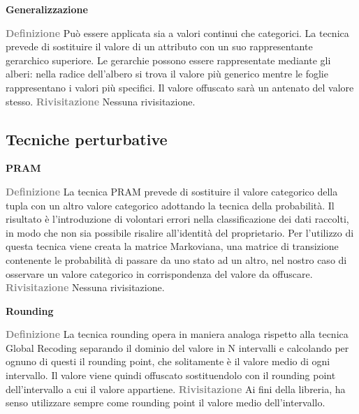 \medskip
\noindent\textbf{Generalizzazione}
\begin{adjustwidth}{2.5em}{0pt}
 \textbf{\textcolor{gray}{Definizione}} \newline
Può essere applicata sia a valori continui che categorici. La tecnica prevede di sostituire il valore di un attributo con un suo rappresentante gerarchico superiore.  Le gerarchie possono essere rappresentate mediante gli alberi: nella radice dell’albero si trova il valore più generico mentre le foglie rappresentano i valori più specifici. Il valore offuscato sarà un antenato del valore stesso.\newline
\textbf{\textcolor{gray}{Rivisitazione}} \newline
Nessuna rivisitazione.
\end{adjustwidth}

\subsection*{Tecniche perturbative}

\noindent\textbf{PRAM}
\begin{adjustwidth}{2.5em}{0pt}
 \textbf{\textcolor{gray}{Definizione}} \newline
La tecnica PRAM prevede di sostituire il valore categorico della tupla con un altro valore categorico adottando la tecnica della probabilità. Il risultato è l'introduzione di volontari errori nella classificazione dei dati raccolti, in modo che non sia possibile risalire all’identità del proprietario. Per l’utilizzo di questa tecnica viene creata la matrice Markoviana, una matrice di transizione contenente le probabilità di passare da uno stato ad un altro, nel nostro caso di osservare un valore categorico in corrispondenza del valore da offuscare. \newline
\textbf{\textcolor{gray}{Rivisitazione}} \newline
Nessuna rivisitazione.
\end{adjustwidth}
\medskip
\noindent\textbf{Rounding}
\begin{adjustwidth}{2.5em}{0pt}
 \textbf{\textcolor{gray}{Definizione}} \newline
La tecnica rounding opera in maniera analoga rispetto alla tecnica Global Recoding separando il dominio del valore in N intervalli e calcolando per ognuno di questi il rounding point, che solitamente è il valore medio di ogni intervallo.  Il valore viene quindi offuscato sostituendolo con il rounding point dell’intervallo a cui il valore appartiene.\newline
\textbf{\textcolor{gray}{Rivisitazione}} \newline
Ai fini della libreria, ha senso utilizzare sempre come rounding point il valore medio dell'intervallo. 
\end{adjustwidth}

